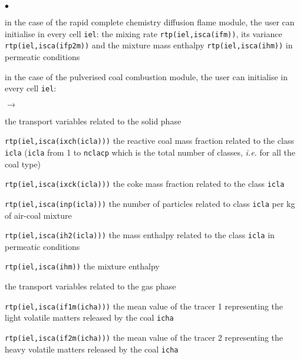 {{\begin{list}{$\bullet$}{}
        \item in the case of the rapid complete chemistry diffusion flame
             module, the user can initialise in every cell \texttt{iel}: the
             mixing rate \texttt{rtp(iel,isca(ifm))}, its variance
             \texttt{rtp(iel,isca(ifp2m))} and the mixture mass
             enthalpy \texttt{rtp(iel,isca(ihm))} in permeatic conditions

        \item in the case of the pulverised coal combustion module, the
             user can initialise in every cell \texttt{iel}:
              \begin{list}{$\rightarrow$}{}
                     \item the transport variables related to the solid phase
                           \begin{list}{}{}
                                  \item \texttt{rtp(iel,isca(ixch(icla)))} the reactive coal mass fraction related to the class \texttt{icla} (\texttt{icla} from 1 to \texttt{nclacp} which is the total number of classes, {\em i.e.} for all the coal type)
                                  \item \texttt{rtp(iel,isca(ixck(icla)))} the coke mass fraction related to the class \texttt{icla}
                                  \item        \texttt{rtp(iel,isca(inp(icla)))} the number of particles related to class \texttt{icla} per kg of air-coal mixture
                                  \item \texttt{rtp(iel,isca(ih2(icla)))} the mass enthalpy related to the class \texttt{icla} in permeatic conditions
                           \end{list}
                     \item \texttt{rtp(iel,isca(ihm))} the mixture enthalpy
                     \item the transport variables related to the gas phase
                           \begin{list}{}{}
                                  \item
                                       \texttt{rtp(iel,isca(if1m(icha)))} the mean value of the tracer 1 representing the light volatile matters released by the coal \texttt{icha}
                                  \item
                                       \texttt{rtp(iel,isca(if2m(icha)))} the mean value of the tracer 2 representing the heavy volatile matters released by the coal \texttt{icha}

\end{list}
\end{list}
\end{list}}}
